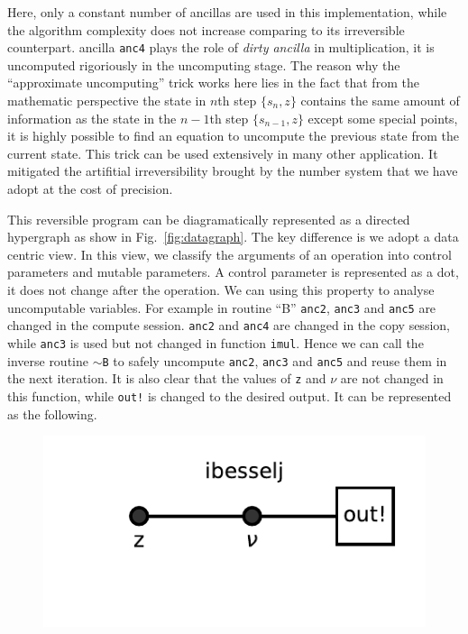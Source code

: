 \documentclass[aps,twocolumn,longbibliography,english,superscriptaddress]{revtex4-1}
\newcommand{\<}{\langle}
\renewcommand{\>}{\rangle}
\newcommand{\Fig}[1]{Fig.~\ref{#1}}
\theoremstyle{definition}\newtheorem{definition}{\textit{Definition}}
\begin{document}
Here, only a constant number of ancillas are used in this implementation, while the algorithm complexity does not increase comparing to its irreversible counterpart.
ancilla \texttt{anc4} plays the role of \textit{dirty ancilla} in multiplication, it is uncomputed rigoriously in the uncomputing stage.
The reason why the ``approximate uncomputing'' trick works here lies in the fact that from the mathematic perspective the state in $n$th step $\{s_n, z\}$ contains the same amount of information as the state in the $n-1$th step $\{s_{n-1}, z\}$ except some special points, it is highly possible to find an equation to uncompute the previous state from the current state.
This trick can be used extensively in many other application. It mitigated the artifitial irreversibility brought by the number system that we have adopt at the cost of precision.

This reversible program can be diagramatically represented as a directed hypergraph as show in \Fig{fig:datagraph}.
The key difference is we adopt a data centric view.
In this view, we classify the arguments of an operation into control parameters and mutable parameters.
A control parameter is represented as a dot, it does not change after the operation.
We can using this property to analyse uncomputable variables. For example in routine ``B'' \texttt{anc2}, \texttt{anc3} and \texttt{anc5} are changed in the compute session.
\texttt{anc2} and \texttt{anc4} are changed in the copy session, while \texttt{anc3} is used but not changed in function \texttt{imul}.
Hence we can call the inverse routine \texttt{$\sim$B} to safely uncompute \texttt{anc2}, \texttt{anc3} and \texttt{anc5} and reuse them in the next iteration.
It is also clear that the values of \texttt{z} and \texttt{$\nu$} are not changed in this function, while \texttt{out!} is changed to the desired output. It can be represented as the following.
\begin{figure}[htp]
    \includegraphics[width=0.4\columnwidth,trim={0cm 1.5cm 0cm 1.0cm},clip]{images/fig5.pdf}
\end{figure}
\end{document}
